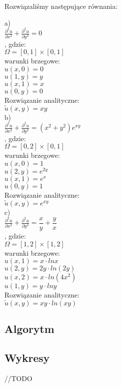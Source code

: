 Rozwiązaliśmy następujące równania:
\begin{multicols}{3}
	a)\\$\frac{\partial^2 u}{\partial x^2} + \frac{\partial^2 u}{\partial y^2} = 0$\vspace{0.2cm}\\, gdzie:\\
	$\Omega = [0,1]\times[0,1]$\\
	warunki brzegowe:\\
	$u(x,0) = 0$\\
	$u(1,y) = y$\\
	$u(x,1) = x$\\
	$u(0,y) = 0$
	\vspace{0.1cm}\\
	Rozwiązanie analityczne:\\
	\columnbreak
	$\widetilde{u}(x,y) = xy$\\
	b)\\$\frac{\partial^2 u}{\partial x^2} + \frac{\partial^2 u}{\partial y^2} = (x^2+y^2)e^{xy}$\vspace{0.2cm}\\, gdzie:\\
	$\Omega = [0,2]\times[0,1]$\\
	warunki brzegowe:\\
	$u(x,0) = 1$\\
	$u(2,y) = e^{2y}$\\
	$u(x,1) = e^x$\\	
	$u(0,y) = 1$
	\vspace{0.1cm}\\
	Rozwiązanie analityczne:\\
	\columnbreak
	$\widetilde{u}(x,y) = e^{xy}$\\
	c)\\$\frac{\partial^2 u}{\partial x^2} + \frac{\partial^2 u}{\partial y^2} = \dfrac{x}{y} + \dfrac{y}{x}$\vspace{0cm}\\, gdzie:\\
	$\Omega = [1,2]\times[1,2]$\\
	warunki brzegowe:\\
	$u(x,1) = x\cdot lnx$\\
	$u(2,y) = 2y\cdot ln(2y)$\\
	$u(x,2) = x\cdot ln(4x^2)$\\
	$u(1,y) = y\cdot lny$
	\vspace{0.1cm}\\
	Rozwiązanie analityczne:\\
	$\widetilde{u}(x,y) = xy\cdot ln(xy)$
	
	
\end{multicols}
\newpage
\subsection{Algorytm}

\begin{samepage}

\end{samepage}
\subsection{Wykresy}
//TODO